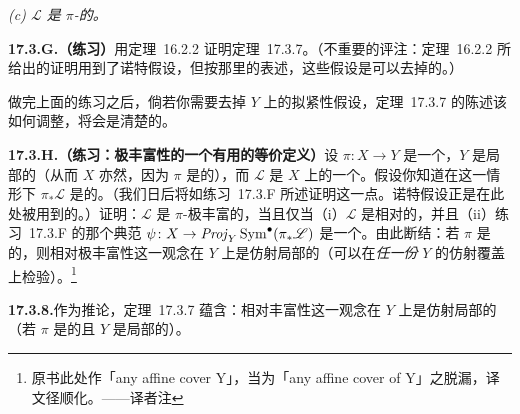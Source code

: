 \emph{(c) \trInvertibleSheaf{} $\mathscr{L}$ 是 $\pi$-\trAmple{}的。}

\textbf{17.3.G.（练习）}\quad 用\mbox{定理~16.2.2} 证明\mbox{定理~17.3.7}。（不重要的评注：\mbox{定理~16.2.2} 所给出的证明用到了诺特假设，但按那里的表述，这些假设是可以去掉的。）

做完上面的练习之后，倘若你需要去掉 $Y$ 上的拟紧性假设，\mbox{定理~17.3.7} 的陈述该如何调整，将会是清楚的。

\textbf{17.3.H.（练习：极丰富性的一个有用的等价定义）}\quad 设 $\pi\colon X\to Y$ 是一个\trProper\trMorphism，$Y$ 是局部\trNoetherian{}的（从而 $X$ 亦然，因为 $\pi$ 是\trFiniteType{}的），而 $\mathscr{L}$ 是 $X$ 上的一个\trInvertibleSheaf。假设你知道在这一情形下 $\pi_*\mathscr{L}$ 是\trFiniteType{}的。（我们日后将如\mbox{练习~17.3.F} 所述证明这一点。诺特假设正是在此处被用到的。）证明：$\mathscr{L}$ 是 $\pi$-极丰富的，当且仅当（i）$\mathscr{L}$ 是相对\trBasePointFree{}的，并且（ii）\mbox{练习~17.3.F} 的那个典范\trMorphism{} $\psi\colon X\to\mathit{Proj}_Y\operatorname{Sym}^\bullet(\pi_*\mathscr{L})$ 是一个\trClosedEmbedding。由此断结：若 $\pi$ 是\trProper{}的，则相对极丰富性这一观念在 $Y$ 上是仿射局部的（可以在\emph{任一份} $Y$ 的仿射覆盖上检验）。\footnote{原书此处作「any affine cover Y」，当为「any affine cover of Y」之脱漏，译文径顺化。——译者注}

\textbf{17.3.8.}\quad 作为推论，\mbox{定理~17.3.7} 蕴含：相对丰富性这一观念在 $Y$ 上是仿射局部的（若 $\pi$ 是\trProper{}的且 $Y$ 是局部\trNoetherian{}的）。

